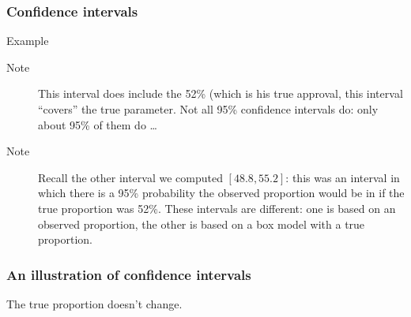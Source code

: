 \documentclass[handout]{beamer}
\begin{document}

   \begin{frame} \frametitle{Confidence intervals}

   \begin{block}
   {Example}
   \begin{description}
   \item[Note] This interval does include the 52\% (which is his
   {\color{blue} true approval}, this interval ``covers'' the true parameter.
   Not all 95\% confidence intervals do: only about 95\% of them do \dots
   \item[Note] Recall the other interval we computed $[48.8,55.2]$: this
   was an interval in which there is a 95\% probability the {\color{orange}
   observed proportion} would be in if the {\color{blue} true proportion}
   was {\color{blue} 52\%}. These intervals are different: one is based
   on an {\color{orange} observed proportion}, the other is based on
   a  box model with a  {\color{blue} true proportion}.
   \end{description}
   \end{block}
   \end{frame}



   \begin{frame}
   \frametitle{An illustration of confidence intervals}
   \begin{center}
   \end{center}
   The {\color{blue} true proportion} doesn't change.
   \end{frame}
\end{document}
